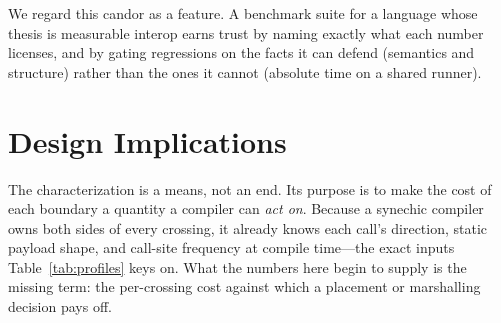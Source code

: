 \documentclass[conference]{IEEEtran}
\begin{document}
We regard this candor as a feature. A benchmark suite for a language whose thesis
is measurable interop earns trust by naming exactly what each number licenses,
and by gating regressions on the facts it can defend (semantics and structure)
rather than the ones it cannot (absolute time on a shared runner).

\section{Design Implications}
\label{sec:implications}

The characterization is a means, not an end. Its purpose is to make the cost of
each boundary a quantity a compiler can \emph{act on}. Because a synechic
compiler owns both sides of every crossing, it already knows each call's
direction, static payload shape, and call-site frequency at compile time---the
exact inputs Table~\ref{tab:profiles} keys on. What the numbers here begin to
supply is the missing term: the per-crossing cost against which a placement or
marshalling decision pays off.
\end{document}
